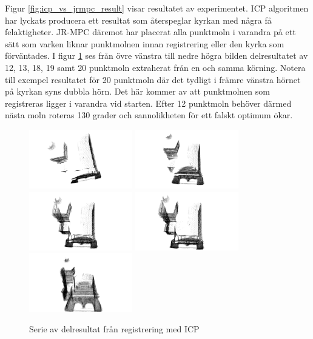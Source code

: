 Figur \ref{fig:icp_vs_jrmpc_result} visar resultatet av experimentet. ICP algoritmen har lyckats producera ett resultat som återspeglar kyrkan med några få felaktigheter. JR-MPC däremot har placerat alla punktmoln i varandra på ett sätt som varken liknar punktmolnen innan registrering eller den kyrka som förväntades. I figur \ref{fig:registered_church_serie} ses från övre vänstra till nedre högra bilden delresultatet av 12, 13, 18, 19 samt 20 punktmoln extraherat från en och samma körning. Notera till exempel resultatet för 20 punktmoln där det tydligt i främre vänstra hörnet på kyrkan syns dubbla hörn. Det här kommer av att punktmolnen som registreras ligger i varandra vid starten. Efter 12 punktmoln behöver därmed nästa moln roteras 130 grader och sannolikheten för ett falskt optimum ökar.
\begin{figure}[H]
	\centering
	\includegraphics[width=45mm]{figures/12_pc.png}
	\includegraphics[width=45mm]{figures/13_pc.png}
	\includegraphics[width=45mm]{figures/18_pc.png}
	\includegraphics[width=45mm]{figures/19_pc.png}
	\includegraphics[width=45mm]{figures/20_pc.png}
	\caption{Serie av delresultat från registrering med ICP}
	\label{fig:registered_church_serie}
\end{figure}

